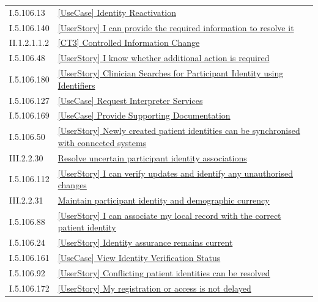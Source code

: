\begin{longtable}{p{.22\linewidth}p{.73\linewidth}}
I.5.106.13 & \hyperref[element:2dd8f44e1a6c412ea759fceca9f48e94]{[UseCase] Identity Reactivation} \\
I.5.106.140 & \hyperref[element:2e72a6aea5dc498fb1dcd69325551ce9]{[UserStory] I can provide the required information to resolve it} \\
II.1.2.1.1.2 & \hyperref[element:2eed03f280434e369d7118b63259c02d]{[CT3] Controlled Information Change} \\
I.5.106.48 & \hyperref[element:2ef0d9162494487bbeba95d42e2ec0b7]{[UserStory] I know whether additional action is required} \\
I.5.106.180 & \hyperref[element:2fd234206ada4083939d30748af75ca0]{[UserStory] Clinician Searches for Participant Identity using Identifiers} \\
I.5.106.127 & \hyperref[element:303f689c5ba0405388868cf15f3b1ea3]{[UseCase] Request Interpreter Services} \\
I.5.106.169 & \hyperref[element:3067fc103e8a4c12b0192cac1a46c05c]{[UseCase] Provide Supporting Documentation} \\
I.5.106.50 & \hyperref[element:31d9a88a79b94a7e8535cfe4537a8526]{[UserStory] Newly created patient identities can be synchronised with connected systems} \\
III.2.2.30 & \hyperref[element:32fcf92667ae46578ab213f879c8a799]{Resolve uncertain participant identity associations} \\
I.5.106.112 & \hyperref[element:386a9ed30493424a95a389537ffa2b56]{[UserStory] I can verify updates and identify any unauthorised changes} \\
III.2.2.31 & \hyperref[element:393b2a5eeda94c36841c2673ca1f391e]{Maintain participant identity and demographic currency} \\
I.5.106.88 & \hyperref[element:3a1a8c1fe57e4c5a881ae6cab8d50479]{[UserStory] I can associate my local record with the correct patient identity} \\
I.5.106.24 & \hyperref[element:3a693c750cfc4285955cf03f6fd5efc9]{[UserStory] Identity assurance remains current} \\
I.5.106.161 & \hyperref[element:3af8bafbbcb34b9abf4183a9cb7f52bd]{[UseCase] View Identity Verification Status} \\
I.5.106.92 & \hyperref[element:3d74c05e000a4029920f1bce28bccfd4]{[UserStory] Conflicting patient identities can be resolved} \\
I.5.106.172 & \hyperref[element:3e3e7d09b3064379a6dad88719ae867e]{[UserStory] My registration or access is not delayed} \\

\end{longtable}
